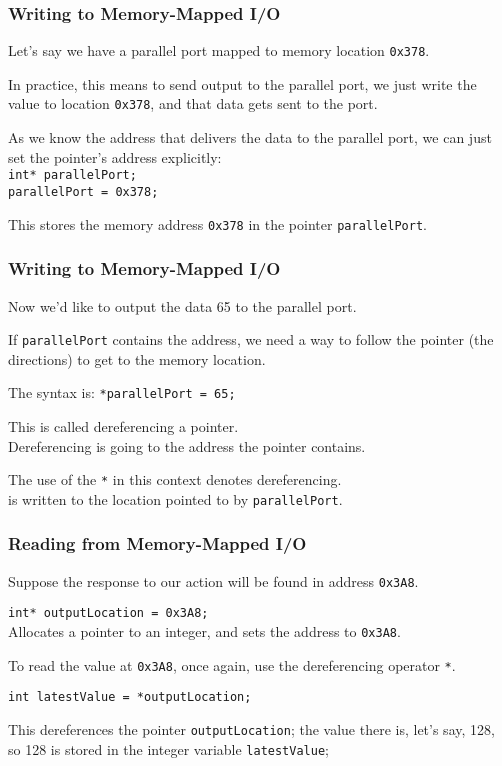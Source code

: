 \begin{frame}
\frametitle{Writing to Memory-Mapped I/O}

Let's say we have a parallel port mapped to memory location \texttt{0x378}.

In practice, this means to send output to the parallel port, we just write the value to location \texttt{0x378}, and that data gets sent to the port.

As we know the address that delivers the data to the parallel port, we can just set the pointer's address explicitly:\\
\quad \texttt{int* parallelPort;\\
\quad parallelPort = 0x378;}

This stores the memory address \texttt{0x378} in the pointer \texttt{parallelPort}.

\end{frame}

\begin{frame}
\frametitle{Writing to Memory-Mapped I/O}
Now we'd like to output the data 65 to the parallel port.

If \texttt{parallelPort} contains the address, we need a way to follow the pointer (the directions) to get to the memory location.

The syntax is: \texttt{*parallelPort = 65;}		

This is called \alert{dereferencing} a pointer. \\
\quad Dereferencing is going to the address the pointer contains.

The use of the \texttt{*} in this context denotes dereferencing.\\
 is written to the location pointed to by \texttt{parallelPort}.

\end{frame}

\begin{frame}
\frametitle{Reading from Memory-Mapped I/O}
Suppose the response to our action will be found in address \texttt{0x3A8}.

\texttt{int* outputLocation = 0x3A8;}\\
\quad Allocates a pointer to an integer, and sets the address to \texttt{0x3A8}.

To read the value at \texttt{0x3A8}, once again, use the dereferencing operator \texttt{*}.

\texttt{int latestValue = *outputLocation;}

This dereferences the pointer \texttt{outputLocation}; the value there is, let's say, 128, so 128 is stored in the integer variable \texttt{latestValue};

\end{frame}

